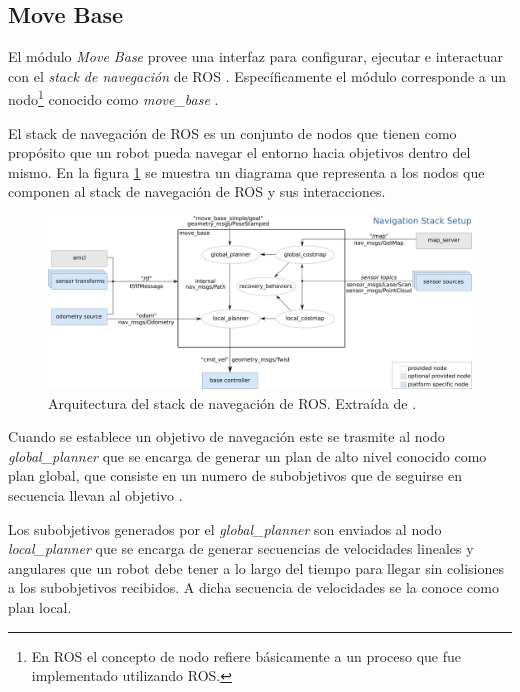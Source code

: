\subsection{Move Base}\label{subsec:move_base}
El módulo \emph{Move Base} provee una interfaz para configurar, ejecutar e
interactuar con el \emph{stack de navegación} de \gls{ROS}
\cite{ROS-navigation}. Específicamente el módulo corresponde a un
nodo\footnote{En \gls{ROS} el concepto de nodo refiere básicamente a un proceso
  que fue implementado utilizando ROS.} conocido como \emph{move\_base}
  \cite{ROS-move_base}. 

El stack de navegación de \gls{ROS} es un conjunto de nodos que tienen como propósito
que un robot pueda navegar el entorno hacia objetivos dentro del mismo. En la
figura \ref{fig:move_base} se muestra un diagrama que representa a los nodos que
componen al stack de navegación de \gls{ROS} y sus interacciones.

\begin{figure}[H]
  \center
  \includegraphics[width=1\linewidth]{imagenes/move_base.png}
  \caption[Arquitectura del stack de navegación de ROS.]{Arquitectura del stack de navegación de \gls{ROS}. Extraída de \cite{ROS-move_base}.}
  \label{fig:move_base}
\end{figure} 

Cuando se establece un objetivo de navegación este se trasmite al nodo
\emph{global\_planner} que se encarga de generar un plan de alto nivel
conocido como plan global, que consiste en un numero de subobjetivos que de
seguirse en secuencia llevan al objetivo .

Los subobjetivos generados por el \emph{global\_planner} son enviados al nodo
\emph{local\_planner} que se encarga de generar secuencias de velocidades
lineales y angulares que un robot debe tener a lo largo del tiempo para llegar
sin colisiones a los subobjetivos recibidos. A dicha secuencia de velocidades
se la conoce como plan local.

